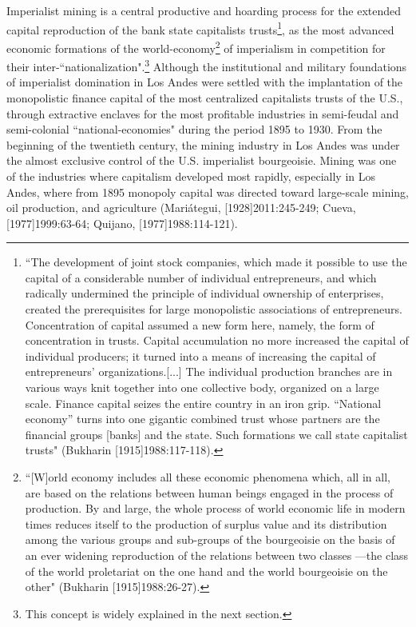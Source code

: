 \documentclass[]{interact}
\theoremstyle{plain}%
\theoremstyle{definition}
\theoremstyle{remark}
\begin{document}
Imperialist mining is a central productive and hoarding process for the extended capital reproduction of the bank state capitalists trusts\footnote{“The development of joint  stock companies, which made it possible to use the capital of  a considerable number of individual entrepreneurs, and which  radically undermined the principle of individual ownership of  enterprises, created the prerequisites for large monopolistic associations of entrepreneurs. Concentration of capital assumed  a new form here, namely, the form of concentration in trusts.
Capital accumulation no more increased the capital of individual producers; it turned into a means of increasing the capital of entrepreneurs’ organizations.[...] The individual  production branches are in various ways knit together into one collective body, organized on a large scale. Finance capital seizes the entire country in an iron grip. “National economy” turns into one gigantic combined trust whose partners are the financial groups [banks] and the state. Such formations we call state capitalist trusts" (Bukharin [1915]1988:117-118).}, as the most advanced economic formations of the world-economy\footnote{“[W]orld  economy includes all these economic phenomena which, all  in all, are based on the relations between human beings engaged in the process of production. By and large, the whole  process of world economic life in modern times reduces itself  to the production of surplus value and its distribution among the various groups and sub-groups of the bourgeoisie on the  basis of an ever widening reproduction of the relations between two classes —the class of the world proletariat on the one hand and the world bourgeoisie on the other" (Bukharin [1915]1988:26-27).} of imperialism in competition for their inter-“nationalization".\footnote{This concept is widely explained in the next section.}
Although the institutional and military foundations of imperialist domination in Los Andes were settled with the implantation of the monopolistic finance capital of the most centralized capitalists trusts of the U.S., through extractive enclaves for the most profitable industries in semi-feudal and semi-colonial “national-economies" during the period 1895 to 1930. From the beginning of the twentieth century, the mining industry in Los Andes was under the almost exclusive control of the U.S. imperialist bourgeoisie. Mining was one of the industries where capitalism developed most rapidly, especially in Los Andes, where from 1895 monopoly capital was directed toward large-scale mining, oil production, and agriculture (Mariátegui, [1928]2011:245-249; Cueva, [1977]1999:63-64; Quijano, [1977]1988:114-121).
\end{document}
